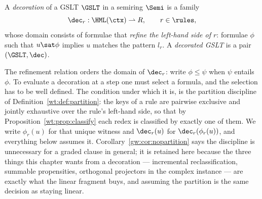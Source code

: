 \begin{definition}[Decoration]
\label{def:decoration}
A \emph{decoration} of a GSLT $\GSLT$ in a semiring $\Semi$ is a family
\[
  \dec_r : \HML(\ctx) \rightharpoonup R, \qquad r \in \rules,
\]
whose domain consists of formulae that \emph{refine the left-hand side of
$r$}: formulae $\phi$ such that $u \sat \phi$ implies $u$ matches the
pattern $l_r$.  A \emph{decorated GSLT} is a pair $(\GSLT, \dec)$.
\end{definition}

The refinement relation orders the domain of $\dec_r$: write
$\phi \leq \psi$ when $\psi$ entails $\phi$.  To evaluate a decoration at
a step one must select a formula, and the selection has to be well
defined.  The condition under which it is, is the partition discipline of
Definition~\ref{wt:def:partition}: the keys of a rule are pairwise
exclusive and jointly exhaustive over the rule's left-hand side, so that
by Proposition~\ref{wt:prop:classify} each redex is classified by exactly
one of them.  We write $\phi_r(u)$ for that unique witness and $\dec_r(u)$
for $\dec_r(\phi_r(u))$, and everything below assumes it.
Corollary~\ref{gw:cor:nopartition} says the discipline is unnecessary
for a graded clause in general; it is retained here because the three
things this chapter wants from a decoration --- incremental
reclassification, summable propensities, orthogonal projectors in the
complex instance --- are exactly what the linear fragment buys, and
assuming the partition is the same decision as staying linear.

